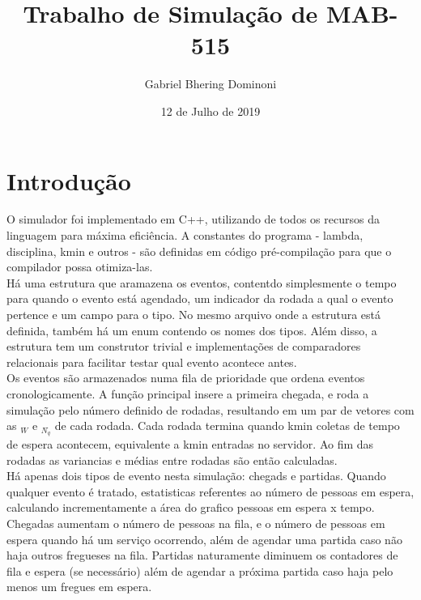 \documentclass{article}
\title{Trabalho de Simulação de MAB-515}
\author{ Gabriel Bhering Dominoni }
\date{12 de Julho de 2019}
\newcommand*\barra[2][]{\overline{ #1_{#2} }}
\begin{document}
\maketitle
\thispagestyle{empty}

\pagebreak

\tableofcontents

\pagebreak

\section{Introdução}
O simulador foi implementado em C++, utilizando de todos os recursos da linguagem para máxima eficiência. A constantes do programa - lambda, disciplina, kmin e outros - são definidas em código pré-compilação para que o compilador possa otimiza-las. \\

Há uma estrutura que aramazena os eventos, contentdo simplesmente o tempo para quando o evento está agendado, um indicador da rodada a qual o evento pertence e um campo para o tipo. No mesmo arquivo onde a estrutura está definida, também há um enum contendo os nomes dos tipos. Além disso, a estrutura tem um construtor trivial e implementações de comparadores relacionais para facilitar testar qual evento acontece antes. \\

Os eventos são armazenados numa fila de prioridade que ordena eventos cronologicamente. A função principal insere a primeira chegada, e roda a simulação pelo número definido de rodadas, resultando em um par de vetores com as $\barra{W}$ e $\barra{N_q}$ de cada rodada. Cada rodada termina quando kmin coletas de tempo de espera acontecem, equivalente a kmin entradas no servidor. Ao fim das rodadas as variancias e médias entre rodadas são então calculadas. \\

Há apenas dois tipos de evento nesta simulação: chegads e partidas. Quando qualquer evento é tratado, estatisticas referentes ao número de pessoas em espera, calculando incrementamente a área do grafico pessoas em espera x tempo. Chegadas aumentam o número de pessoas na fila, e o número de pessoas em espera quando há um serviço ocorrendo, além de agendar uma partida caso não haja outros fregueses na fila. Partidas naturamente diminuem os contadores de fila e espera (se necessário) além de agendar a próxima partida caso haja pelo menos um fregues em espera. \\
\end{document}
